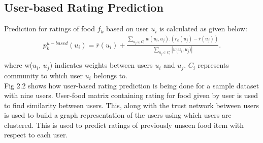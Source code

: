 \subsection{User-based Rating Prediction}
Prediction for ratings of food $f_k$ based on user $u_i$ is calculated as given below\cite*{9775081}:
\begin{align*} p_{k}^{u-based}\left({u_{i}}\right)\!=\!\bar {r}\left({u_{i}}\right)+\frac {\sum _{u_{j}\in C_{i}}{w(u_{i},u_{j}).\left({r_{k}\left({u_{j}}\right)\!-\!\bar {r}\left({u_{j}}\right)}\right)}}{\sum _{u_{j}\in C_{i}}\left |{w_{(}u_{i},u_{j})}\right |}. \\\tag{4}\end{align*}
where w($u_i$, $u_j$) indicates weights between users $u_i$ and $u_j$. $C_i$ represents community to which user $u_i$ belongs to.
\\
Fig 2.2\cite*{9775081} shows how user-based rating prediction is being done for a sample dataset with nine users\cite*{9775081}. User-food matrix containing rating for food given by user is used to find similarity between users. This, along with the trust network between users is used to build a graph representation of the users using which users are clustered. This is used to predict ratings of previously unseen food item with respect to each user.
